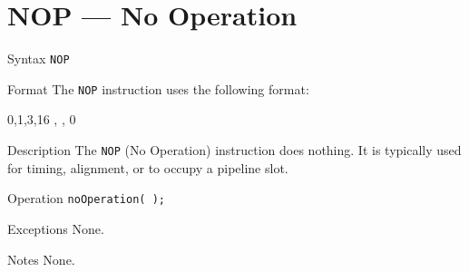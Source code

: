 %
%
\pagebreak
\section*{NOP — No Operation}

\begin{iPageDescEntry}{Syntax}
    \texttt{NOP}
\end{iPageDescEntry}

\begin{iPageDescEntry}{Format}
    The \texttt{NOP} instruction uses the following format: \\

    \begin{flushleft}
    \drawInstrFormat
        {0,1,3,16}
        {\OpCodeGrpALU, \OpCodeNOP, 0}
    \end{flushleft}
\end{iPageDescEntry}

\begin{iPageDescEntry}{Description}
    The \texttt{NOP} (No Operation) instruction does nothing. It is typically used for timing, alignment, or to occupy a pipeline slot.
\end{iPageDescEntry}

\begin{iPageDescEntry}{Operation}
    \texttt{noOperation( );}
\end{iPageDescEntry}

\begin{iPageDescEntry}{Exceptions}
    None.
\end{iPageDescEntry}

\begin{iPageDescEntry}{Notes}
    None.
\end{iPageDescEntry}

